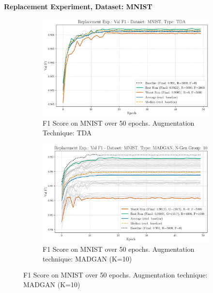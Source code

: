 \noindent\textbf{Replacement Experiment, Dataset: MNIST}
\begin{figure}[H]
	\centering
	\begin{subfigure}{.85\textwidth}
		\includegraphics[width=\textwidth]{abb/strat_classifier_performance/tda_mnist/replacement_experiments/val_f1_score_tda_mnist_mnist_all.png}
		\caption{F1 Score on MNIST over 50 epochs. Augmentation Technique: TDA} 
        \label{fig:res_replacement_mnist_tda_vs_madgan__tda}
	\end{subfigure}
	\begin{subfigure}{.85\textwidth}
		\includegraphics[width=\textwidth]{abb/strat_classifier_performance/MNIST_STRATIFIED_CLASSIFIERS_MADGAN_NEW/replacement_experiments/val_f1_score_MADGAN_MNIST_n_gen_10_all.png}
		\caption{F1 Score on MNIST over 50 epochs. Augmentation technique: MADGAN (K=10)} 
        \label{fig:res_replacement_mnist_tda_vs_madgan__madgan}
	\end{subfigure}
\end{figure}

